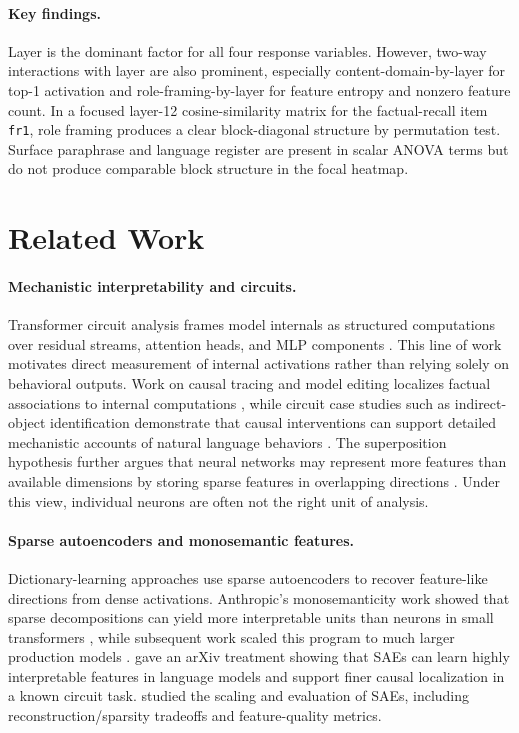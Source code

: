 \documentclass[11pt]{article}
\begin{document}
\paragraph{Key findings.}
Layer is the dominant factor for all four response variables. However, two-way interactions with layer are also prominent, especially content-domain-by-layer for top-1 activation and role-framing-by-layer for feature entropy and nonzero feature count. In a focused layer-12 cosine-similarity matrix for the factual-recall item \texttt{fr1}, role framing produces a clear block-diagonal structure by permutation test. Surface paraphrase and language register are present in scalar ANOVA terms but do not produce comparable block structure in the focal heatmap.

\section{Related Work}

\paragraph{Mechanistic interpretability and circuits.}
Transformer circuit analysis frames model internals as structured computations over residual streams, attention heads, and MLP components \citep{elhage2021framework}. This line of work motivates direct measurement of internal activations rather than relying solely on behavioral outputs. Work on causal tracing and model editing localizes factual associations to internal computations \citep{meng2022locating}, while circuit case studies such as indirect-object identification demonstrate that causal interventions can support detailed mechanistic accounts of natural language behaviors \citep{wang2023interpretability}. The superposition hypothesis further argues that neural networks may represent more features than available dimensions by storing sparse features in overlapping directions \citep{elhage2022toy}. Under this view, individual neurons are often not the right unit of analysis.

\paragraph{Sparse autoencoders and monosemantic features.}
Dictionary-learning approaches use sparse autoencoders to recover feature-like directions from dense activations. Anthropic's monosemanticity work showed that sparse decompositions can yield more interpretable units than neurons in small transformers \citep{bricken2023monosemanticity}, while subsequent work scaled this program to much larger production models \citep{templeton2024scaling}. \citet{cunningham2023sparse} gave an arXiv treatment showing that SAEs can learn highly interpretable features in language models and support finer causal localization in a known circuit task. \citet{gao2024scaling} studied the scaling and evaluation of SAEs, including reconstruction/sparsity tradeoffs and feature-quality metrics.
\end{document}
